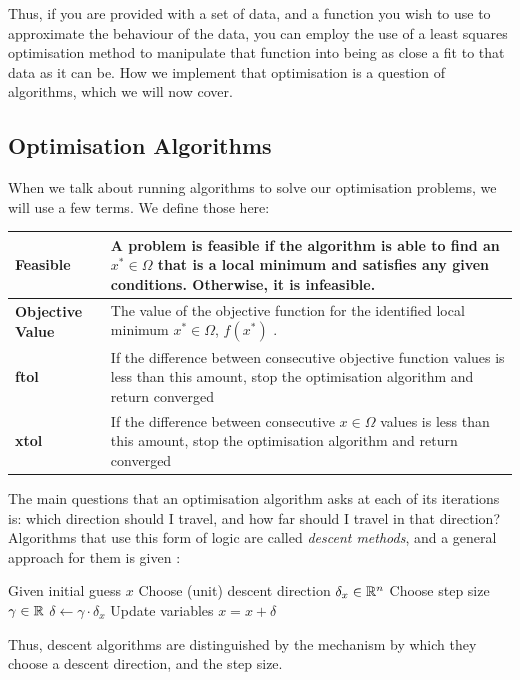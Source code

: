Thus, if you are provided with a set of data, and a function you wish to use to approximate the behaviour of the data, you can 
employ the use of a least squares optimisation method to manipulate that function into being as close a fit to that data as 
it can be. How we implement that optimisation is a question of algorithms, which we will now cover.

\subsection{Optimisation Algorithms}

\begin{notn}
    When we talk about running algorithms to solve our optimisation problems, we will use a few terms. We define those here:    
    \begin{table}[h!]
        \begin{tabular}{p{3.5cm}|p{10cm}}
            \hline
            \textbf{Feasible} & A problem is feasible if the algorithm is able to find an $x^* \in \Omega$ that is a local minimum and satisfies any given conditions. Otherwise, it is \textbf{infeasible}. \\ \hline
            \textbf{Objective Value} & The value of the objective function for the identified local minimum $x^* \in \Omega$, $f(x^*)$ . \\ \hline
            \textbf{ftol} & If the difference between consecutive objective function values is less than this amount, stop the optimisation algorithm and return converged \\ \hline
            \textbf{xtol} & If the difference between consecutive $x \in \Omega$ values is less than this amount, stop the optimisation algorithm and return converged \\ \hline
        \end{tabular}
    \end{table}
    
\end{notn}

The main questions that an optimisation algorithm asks at each of its iterations is: which direction should I travel, and how far 
should I travel in that direction? Algorithms that use this form of logic are called \textit{descent methods}, and a 
general approach for them is given \cite{carlone-least-squares}:

\begin{algorithm}[h!]
    \begin{algorithmic}[1]
        \State Given initial guess $x$
            \State Choose (unit) descent direction $\delta_x \in \mathbb{R}^n$
            \State Choose step size $\gamma \in \mathbb{R}$
            \State $\delta \leftarrow \gamma \cdot \delta_x$
            \State Update variables $x = x + \delta$
        \EndWhile
    \end{algorithmic}
\end{algorithm}
Thus, descent algorithms are distinguished by the mechanism by which they choose a descent direction, and the step size.

